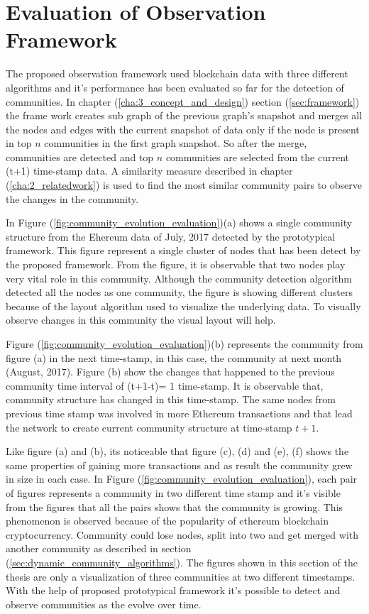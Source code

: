 \section{Evaluation of Observation Framework}
The proposed observation framework used blockchain data with three different algorithms and it's performance has been evaluated so far for the detection of communities. In chapter (\ref{cha:3_concept_and_design}) section (\ref{sec:framework}) the frame work creates sub graph of the previous graph's snapshot and merges all the nodes and edges with the current snapshot of data only if the node is present in top $n$ communities in the first graph snapshot. So after the merge, communities are detected and top $n$ communities are selected from the current (t+1) time-stamp data. A similarity measure described in chapter (\ref{cha:2_relatedwork}) is used to find the most similar community pairs to observe the changes in the community.

In Figure (\ref{fig:community_evolution_evaluation})(a) shows a single community structure from the Ehereum data of July, 2017 detected by the prototypical framework. This figure represent a single cluster of nodes that has been detect by the proposed framework. From the figure, it is observable that two nodes play very vital role in this community. Although the community detection algorithm detected all the nodes as one community, the figure is showing different clusters because of the layout algorithm used to visualize the underlying data. To visually observe changes in this community the visual layout will help.

Figure (\ref{fig:community_evolution_evaluation})(b) represents the community  from figure (a) in the next time-stamp, in this case, the community at next month (August, 2017). Figure (b) show the changes that happened to the previous community time interval of (t+1-t)= 1 time-stamp. It is observable that, community structure has changed in this time-stamp. The same nodes from previous time stamp was involved in more Ethereum transactions and that lead the network to create current community structure at time-stamp $t+1$.

Like figure (a) and (b), its noticeable that figure (c), (d) and (e), (f) shows the same properties of gaining more transactions and as result the community grew in size in each case. In Figure (\ref{fig:community_evolution_evaluation}), each pair of figures represents a community in two different time stamp and it's visible from the figures that all the pairs shows that the community is growing. This phenomenon is observed because of the popularity of ethereum blockchain cryptocurrency. Community could lose nodes, split into two and get merged with another community as described in section (\ref{sec:dynamic_community_algorithms}). The figures shown in this section of the thesis are only a visualization of three communities at two different timestamps. With the help of proposed prototypical framework it's possible to detect and observe communities as the evolve over time.

